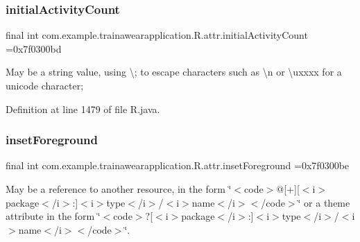 \mbox{\label{classcom_1_1example_1_1trainawearapplication_1_1_r_1_1attr_a25a83d8b3679480c75ced039a9564cb0}} 
\subsubsection{\texorpdfstring{initialActivityCount}{initialActivityCount}}
{\footnotesize\ttfamily final int com.\+example.\+trainawearapplication.\+R.\+attr.\+initial\+Activity\+Count =0x7f0300bd\hspace{0.3cm}{\ttfamily [static]}}

May be a string value, using \textquotesingle{}\textbackslash{};\textquotesingle{} to escape characters such as \textquotesingle{}\textbackslash{}n\textquotesingle{} or \textquotesingle{}\textbackslash{}uxxxx\textquotesingle{} for a unicode character; 

Definition at line 1479 of file R.\+java.

\mbox{\label{classcom_1_1example_1_1trainawearapplication_1_1_r_1_1attr_a8897a08b00504b9242fc799e0e53c48e}} 
\subsubsection{\texorpdfstring{insetForeground}{insetForeground}}
{\footnotesize\ttfamily final int com.\+example.\+trainawearapplication.\+R.\+attr.\+inset\+Foreground =0x7f0300be\hspace{0.3cm}{\ttfamily [static]}}

May be a reference to another resource, in the form \char`\"{}$<$code$>$@\mbox{[}+\mbox{]}\mbox{[}$<$i$>$package$<$/i$>$\+:\mbox{]}$<$i$>$type$<$/i$>$/$<$i$>$name$<$/i$>$$<$/code$>$\char`\"{} or a theme attribute in the form \char`\"{}$<$code$>$?\mbox{[}$<$i$>$package$<$/i$>$\+:\mbox{]}$<$i$>$type$<$/i$>$/$<$i$>$name$<$/i$>$$<$/code$>$\char`\"{}. 

